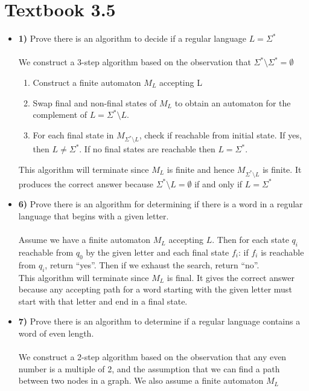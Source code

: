 \documentclass[defaultpackages]{simplereport}
\begin{document}
\section*{Textbook 3.5}
\begin{itemize}[label=]
  \item \textbf{1)} Prove there is an algorithm to decide if a regular language $L = \Sigma^*$\\\\
    We construct a 3-step algorithm based on the observation that $\Sigma^*
    \setminus \Sigma^* = \emptyset$
    \begin{enumerate}
    \item Construct a finite automaton $M_L$ accepting L
    \item Swap final and non-final states of $M_L$ to obtain an automaton for the complement of $L = \Sigma^* \setminus L$.
    \item For each final state in $M_{\Sigma^* \setminus L}$, check if reachable
      from initial state. If yes, then $L \neq \Sigma^*$. If no final states
      are reachable then $L = \Sigma^*$.
    \end{enumerate}
   This algorithm will terminate since $M_L$ is finite and hence $M_{\Sigma^*
     \setminus L}$ is finite. It produces the correct answer because $\Sigma^*
   \setminus L = \emptyset$ if and only if $L = \Sigma^*$
  \item \textbf{6)} Prove there is an algorithm for determining if there is a
    word in a regular language that begins with a given letter.\\\\
    Assume we have a finite automaton $M_L$ accepting $L$. Then for each state
    $q_i$ reachable from $q_0$ by the given letter and each final state $f_i$:
    if $f_i$ is reachable from $q_i$, return ``yes''. Then if we exhaust the
    search, return ``no''.\\
    This algorithm will terminate since $M_L$ is final. It gives the correct
    answer because any accepting path for a word starting with the given letter
    must start with that letter and end in a final state.
  \item \textbf{7)} Prove there is an algorithm to determine if a regular
    language contains a word of even length.\\\\
    We construct a 2-step algorithm based on the observation that any even
    number is a multiple of 2, and the assumption that we can find a path
    between two nodes in a graph. We also assume a finite automaton $M_L$

\end{itemize}
\end{document}

